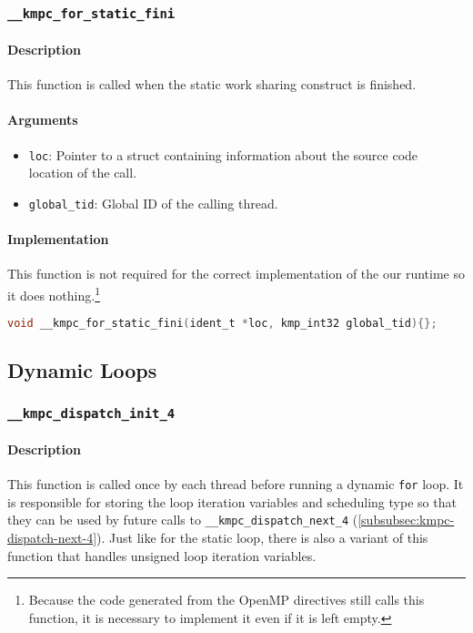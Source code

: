 \subsubsection{\texttt{\_\_kmpc\_for\_static\_fini}}

\paragraph{Description} This function is called when the static work sharing construct is finished.

\paragraph{Arguments}
\begin{itemize}
	\item \texttt{loc}: Pointer to a struct containing information about the source code location
	      of the call.
	\item \texttt{global\_tid}: Global ID of the calling thread.
\end{itemize}

\paragraph{Implementation} This function is not required for the correct implementation of the our
runtime so it does nothing.\footnote{Because the code generated from the OpenMP directives still
	calls this function, it is necessary to implement it even if it is left empty.}

\begin{lstlisting}[language=C, caption={\_\_kmpc\_for\_static\_fini}, label={lst:for-static-fini},
                   escapechar=@]
void __kmpc_for_static_fini(ident_t *loc, kmp_int32 global_tid){};
\end{lstlisting}

\subsection{Dynamic Loops}

\subsubsection{\texttt{__kmpc_dispatch_init_4}}

\paragraph{Description} This function is called once by each thread before running a dynamic
\texttt{for} loop. It is responsible for storing the loop iteration variables and scheduling type so
that they can be used by future calls to \texttt{__kmpc_dispatch_next_4}
(\cref{subsubsec:kmpc-dispatch-next-4}). Just like for the static loop, there is also a variant of
this function that handles unsigned loop iteration variables.

